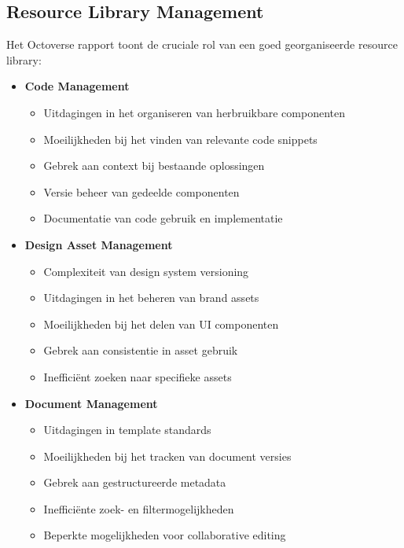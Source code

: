 \subsection{Resource Library Management}
\label{subsec:resource-library}

Het \textcite{GitHub2023} Octoverse rapport toont de cruciale rol van een goed georganiseerde resource library:

\begin{itemize}
    \item \textbf{Code Management}
    \begin{itemize}
        \item Uitdagingen in het organiseren van herbruikbare componenten
        \item Moeilijkheden bij het vinden van relevante code snippets
        \item Gebrek aan context bij bestaande oplossingen
        \item Versie beheer van gedeelde componenten
        \item Documentatie van code gebruik en implementatie
    \end{itemize}
    
    \item \textbf{Design Asset Management}
    \begin{itemize}
        \item Complexiteit van design system versioning
        \item Uitdagingen in het beheren van brand assets
        \item Moeilijkheden bij het delen van UI componenten
        \item Gebrek aan consistentie in asset gebruik
        \item Inefficiënt zoeken naar specifieke assets
    \end{itemize}
    
    \item \textbf{Document Management}
    \begin{itemize}
        \item Uitdagingen in template standards
        \item Moeilijkheden bij het tracken van document versies
        \item Gebrek aan gestructureerde metadata
        \item Inefficiënte zoek- en filtermogelijkheden
        \item Beperkte mogelijkheden voor collaborative editing
    \end{itemize}
\end{itemize}

